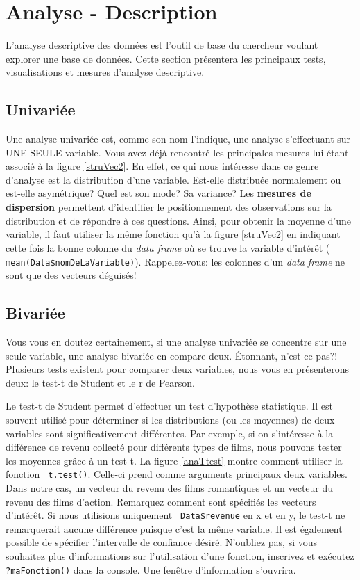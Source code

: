 \documentclass[10.5pt,a4paper]{article}
\newcommand{\rcode}[1]{\texttt{\color{rstudio} #1}}
\begin{document}
  
\section{Analyse - Description}
L'analyse descriptive des données est l'outil de base du chercheur voulant explorer une base de données. Cette section présentera les principaux tests, visualisations et mesures d'analyse descriptive.
  \subsection{Univariée}
  Une analyse univariée est, comme son nom l'indique, une analyse s'effectuant sur UNE SEULE variable. Vous avez déjà rencontré les principales mesures lui étant associé à la figure \ref{struVec2}. En effet, ce qui nous intéresse dans ce genre d'analyse est la distribution d'une variable. Est-elle distribuée normalement ou est-elle asymétrique? Quel est son mode? Sa variance? Les \textbf{mesures de dispersion} permettent d'identifier le positionnement des observations sur la distribution et de répondre à ces questions. Ainsi, pour obtenir la moyenne d'une variable, il faut utiliser la même fonction qu'à la figure \ref{struVec2} en indiquant cette fois la bonne colonne du \emph{data frame} où se trouve la variable d'intérêt (\rcode{mean(Data\$nomDeLaVariable)}). Rappelez-vous: les colonnes d'un \emph{data frame} ne sont que des vecteurs déguisés!
  
  \subsection{Bivariée}
  Vous vous en doutez certainement, si une analyse univariée se concentre sur une seule variable, une analyse bivariée en compare deux. Étonnant, n'est-ce pas?! Plusieurs tests existent pour comparer deux variables, nous vous en présenterons deux: le test-t de Student et le r de Pearson. 
  
  Le test-t de Student permet d'effectuer un test d'hypothèse statistique. Il est souvent utilisé pour déterminer si les distributions (ou les moyennes) de deux variables sont significativement différentes. Par exemple, si on s'intéresse à la différence de revenu collecté pour différents types de films, nous pouvons tester les moyennes grâce à un test-t. La figure \ref{anaTtest} montre comment utiliser la fonction \rcode{t.test()}. Celle-ci prend comme arguments principaux deux variables. Dans notre cas, un vecteur du revenu des films romantiques et un vecteur du revenu des films d'action. Remarquez comment sont spécifiés les vecteurs d'intérêt. Si nous utilisions uniquement \rcode{Data\$revenue} en x et en y, le test-t ne remarquerait aucune différence puisque c'est la même variable. Il est également possible de spécifier l'intervalle de confiance désiré. N'oubliez pas, si vous souhaitez plus d'informations sur l'utilisation d'une fonction, inscrivez et exécutez \rcode{?maFonction()} dans la console. Une fenêtre d'information s'ouvrira. 
  
\end{document}
